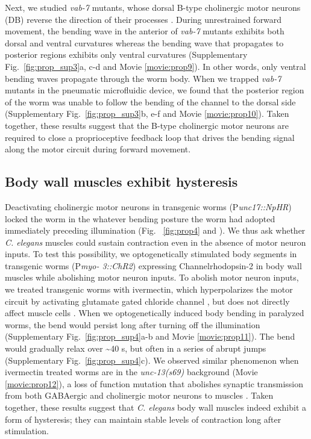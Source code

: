 Next, we studied \textit{vab-7} mutants, whose dorsal B-type cholinergic motor neurons (DB) reverse 
the direction of their processes \citep{esmaeili_c._2002}. During unrestrained forward movement, the bending wave 
in the anterior of \textit{vab-7} mutants exhibits both dorsal and ventral curvatures whereas the bending 
wave that propagates to posterior regions exhibits only ventral curvatures (Supplementary Fig.~\ref{fig:prop_sup3}a, c-d and Movie  \ref{movie:prop9}). In other words, only ventral bending waves propagate 
through the worm body. When we trapped \textit{vab-7} mutants in the pneumatic microfluidic device, 
we found that the posterior region of the worm was unable to follow the bending of the channel 
to the dorsal side (Supplementary Fig.~\ref{fig:prop_sup3}b, e-f and Movie  \ref{movie:prop10}). Taken together, 
these results suggest that the B-type cholinergic motor neurons are required to close a 
proprioceptive feedback loop that drives the bending signal along the motor circuit during 
forward movement. 


\subsection{Body wall muscles exhibit hysteresis}
 
Deactivating cholinergic motor neurons in transgenic worms (P\textit{unc17::NpHR}) locked the worm 
in the whatever bending posture the worm had adopted immediately preceding illumination (Fig. ~\ref{fig:prop4} and  \citep{leifer_optogenetic_2011}). We thus ask 
whether \textit{C. elegans} muscles could sustain contraction even in the absence of motor neuron inputs. 
To test this possibility, we optogenetically stimulated body segments in transgenic worms (P\textit{myo- 3::ChR2}) expressing Channelrhodopsin-2 in body wall muscles while abolishing motor neuron 
inputs. To abolish motor neuron inputs, we treated transgenic worms with ivermectin, which 
hyperpolarizes the motor circuit by activating glutamate gated chloride channel \citep{dent_genetics_2000,cully_cloning_1994}, but 
does not directly affect muscle cells \citep{hart_behavior_2006}. When we optogenetically induced body bending in 
paralyzed worms, the bend would persist long after turning off the illumination (Supplementary Fig.~\ref{fig:prop_sup4}a-b and Movie  \ref{movie:prop11}). The bend would gradually relax over \textasciitilde40 s, but often in 
a series of abrupt jumps (Supplementary Fig.~\ref{fig:prop_sup4}c). We observed similar phenomenon when 
ivermectin treated worms are in the \textit{unc-13(s69)} background (Movie  \ref{movie:prop12}), a loss 
of function mutation that abolishes synaptic transmission from both GABAergic and cholinergic 
motor neurons to muscles \citep{richmond_unc-13_1999}. Taken together, these results suggest that \textit{C. elegans} body wall 
muscles indeed exhibit a form of hysteresis; they can maintain stable levels of contraction long after stimulation.  

